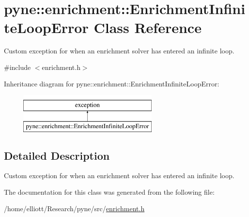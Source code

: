 \hypertarget{classpyne_1_1enrichment_1_1_enrichment_infinite_loop_error}{\section{pyne\-:\-:enrichment\-:\-:Enrichment\-Infinite\-Loop\-Error Class Reference}
\label{classpyne_1_1enrichment_1_1_enrichment_infinite_loop_error}
}


Custom exception for when an enrichment solver has entered an infinite loop.  




{\ttfamily \#include $<$enrichment.\-h$>$}

Inheritance diagram for pyne\-:\-:enrichment\-:\-:Enrichment\-Infinite\-Loop\-Error\-:\begin{figure}[H]
\begin{center}
\leavevmode
\includegraphics[height=2.000000cm]{classpyne_1_1enrichment_1_1_enrichment_infinite_loop_error}
\end{center}
\end{figure}


\subsection{Detailed Description}
Custom exception for when an enrichment solver has entered an infinite loop. 

The documentation for this class was generated from the following file\-:\begin{DoxyCompactItemize}
\item 
/home/elliott/\-Research/pyne/src/\hyperlink{enrichment_8h}{enrichment.\-h}\end{DoxyCompactItemize}
